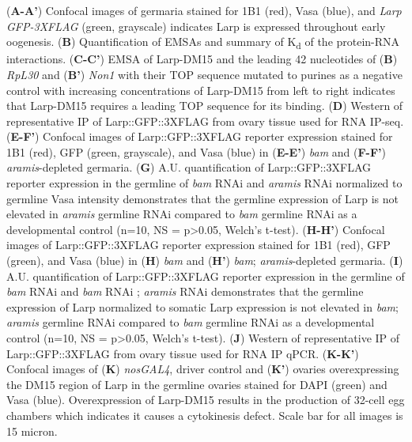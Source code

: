 \documentclass[12pt,oneside]{reedthesis}
\begin{document}
\setlength\parindent{0pt}(\textbf{A-A'}) Confocal images of germaria stained for 1B1 (red), Vasa (blue), and \emph{Larp GFP-3XFLAG} (green, grayscale) indicates Larp is expressed throughout early oogenesis. (\textbf{B}) Quantification of EMSAs and summary of K\textsubscript{d} of the protein-RNA interactions. (\textbf{C-C'}) EMSA of Larp-DM15 and the leading 42 nucleotides of (\textbf{B}) \emph{RpL30} and (\textbf{B'}) \emph{Non1} with their TOP sequence mutated to purines as a negative control with increasing concentrations of Larp-DM15 from left to right indicates that Larp-DM15 requires a leading TOP sequence for its binding. (\textbf{D}) Western of representative IP of Larp::GFP::3XFLAG from ovary tissue used for RNA IP-seq. (\textbf{E-F'}) Confocal images of Larp::GFP::3XFLAG reporter expression stained for 1B1 (red), GFP (green, grayscale), and Vasa (blue) in (\textbf{E-E'}) \emph{bam} and (\textbf{F-F'}) \emph{aramis}-depleted germaria. (\textbf{G}) A.U. quantification of Larp::GFP::3XFLAG reporter expression in the germline of \emph{bam} RNAi and \emph{aramis} RNAi normalized to germline Vasa intensity demonstrates that the germline expression of Larp is not elevated in \emph{aramis} germline RNAi compared to \emph{bam} germline RNAi as a developmental control (n=10, NS = p\textgreater0.05, Welch's t-test). (\textbf{H-H'}) Confocal images of Larp::GFP::3XFLAG reporter expression stained for 1B1 (red), GFP (green), and Vasa (blue) in (\textbf{H}) \emph{bam} and (\textbf{H'}) \emph{bam}; \emph{aramis}-depleted germaria. (\textbf{I}) A.U. quantification of Larp::GFP::3XFLAG reporter expression in the germline of \emph{bam} RNAi and \emph{bam} RNAi ; \emph{aramis} RNAi demonstrates that the germline expression of Larp normalized to somatic Larp expression is not elevated in \emph{bam}; \emph{aramis} germline RNAi compared to \emph{bam} germline RNAi as a developmental control (n=10, NS = p\textgreater0.05, Welch's t-test). (\textbf{J}) Western of representative IP of Larp::GFP::3XFLAG from ovary tissue used for RNA IP qPCR. (\textbf{K-K'}) Confocal images of (\textbf{K}) \emph{nosGAL4}, driver control and (\textbf{K'}) ovaries overexpressing the DM15 region of Larp in the germline ovaries stained for DAPI (green) and Vasa (blue). Overexpression of Larp-DM15 results in the production of 32-cell egg chambers which indicates it causes a cytokinesis defect. Scale bar for all images is 15 micron.

\setlength\parindent{24pt}

\textbf{\hfill\break
}
\end{document}
